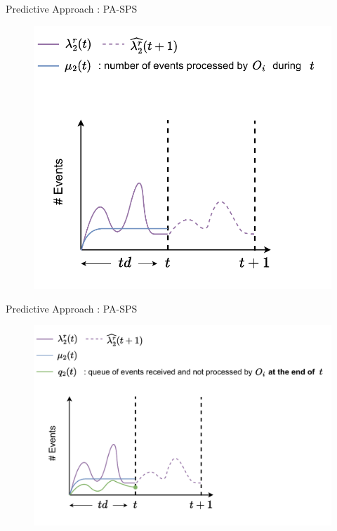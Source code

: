 \begin{frame}{Predictive Approach : PA-SPS}
\begin{figure}
    \centering
    \includegraphics[scale=0.63]{images/concepts/predictive/PA-SPS-Prediction-9.pdf}
\end{figure}
\end{frame}

\begin{frame}{Predictive Approach : PA-SPS}
\begin{figure}
    \centering
    \includegraphics[scale=0.63]{images/concepts/predictive/PA-SPS-Prediction-10.pdf}
\end{figure}
\end{frame}

